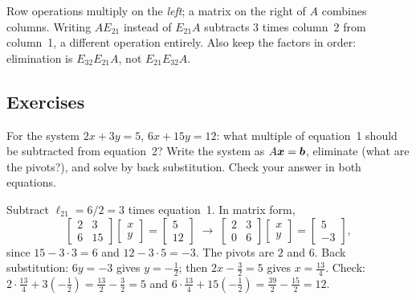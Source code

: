 \begin{trap}
Row operations multiply on the \emph{left}; a matrix on the right of $A$ combines columns.
Writing $AE_{21}$ instead of $E_{21}A$ subtracts $3$ times column~2 from column~1, a
different operation entirely. Also keep the factors in order: elimination is $E_{32}E_{21}A$,
not $E_{21}E_{32}A$.
\end{trap}

\subsection{Exercises}

\begin{exercise}\label{ex:u03-two}
For the system $2x+3y=5$, $6x+15y=12$: what multiple of equation~1 should be subtracted from
equation~2? Write the system as $A\boldsymbol{x}=\boldsymbol{b}$, eliminate (what are the pivots?), and solve by
back substitution. Check your answer in both equations.
\end{exercise}
\begin{solution}
Subtract $\ell_{21}=6/2=3$ times equation~1. In matrix form,
\[
  \begin{bmatrix} 2 & 3\\ 6 & 15\end{bmatrix}\begin{bmatrix} x\\ y\end{bmatrix}
  =\begin{bmatrix} 5\\ 12\end{bmatrix}
  \;\longrightarrow\;
  \begin{bmatrix} 2 & 3\\ 0 & 6\end{bmatrix}\begin{bmatrix} x\\ y\end{bmatrix}
  =\begin{bmatrix} 5\\ -3\end{bmatrix},
\]
since $15-3\cdot3=6$ and $12-3\cdot5=-3$. The pivots are $2$ and $6$. Back substitution:
$6y=-3$ gives $y=-\tfrac12$; then $2x-\tfrac32=5$ gives $x=\tfrac{13}{4}$. Check:
$2\cdot\tfrac{13}{4}+3(-\tfrac12)=\tfrac{13}{2}-\tfrac32=5$ and
$6\cdot\tfrac{13}{4}+15(-\tfrac12)=\tfrac{39}{2}-\tfrac{15}{2}=12$.
\end{solution}

